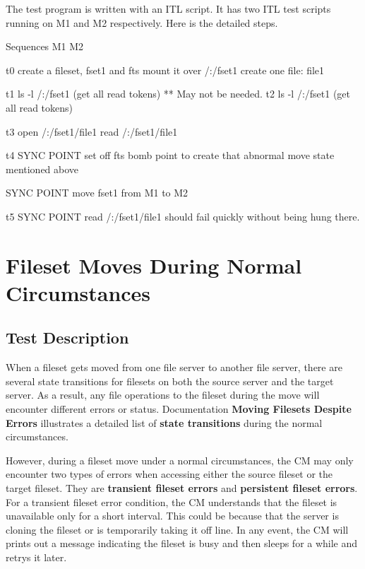 The test program is written with an ITL script. It has two ITL test scripts
running on M1 and M2 respectively. Here is the detailed steps. 

\begin{programexample}

Sequences	M1					M2

t0		create a fileset, fset1 and fts mount it over /:/fset1
		create one file: file1
            
t1							ls -l /:/fset1
							(get all read tokens)
							** May not be needed. 
t2		ls -l /:/fset1
		(get all read tokens)
		

t3		open /:/fset1/file1
		read /:/fset1/file1

t4		SYNC POINT	
		set off fts bomb point to create 
		that abnormal move state mentioned above

		SYNC POINT
		move fset1 from M1 to M2


t5		SYNC POINT
		read /:/fset1/file1 
		should fail quickly without being
		hung there. 

\end{programexample}


\pagebreak
\section {Fileset Moves During Normal Circumstances}
   

\subsection {Test Description}

When a fileset gets moved from one file server to another file server, 
there are several state transitions for filesets 
on both the source server and the target server. 
As a result, any file operations to the fileset during the move will 
encounter different errors or status. 
Documentation {\bf Moving Filesets Despite Errors}
illustrates a detailed list of {\bf state transitions} during the normal 
circumstances. 

However, during a fileset move under a normal circumstances, 
the CM may only encounter two types of errors when accessing either the source
fileset or the target fileset. They are 
{\bf transient fileset errors} and  {\bf persistent fileset errors}. For
a transient fileset error condition, the CM understands that the fileset
is unavailable only for a short interval. This could be because that the 
server is cloning the fileset or is temporarily taking it off line. In 
any event, the CM will prints out a message indicating the fileset is busy
and then sleeps for a while and retrys it later. 

